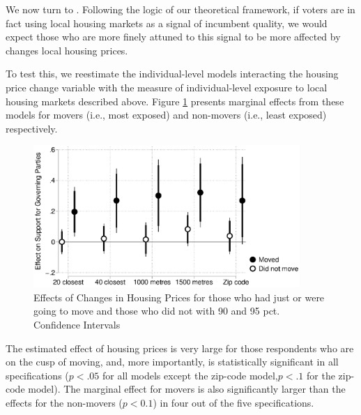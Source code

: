 \documentclass[12pt,a4paper]{article}
\begin{document}
	We now turn to \htwo. Following the logic of our theoretical framework, 	if voters are in fact using local housing markets as a signal of incumbent quality, we would expect those who are more finely attuned to this signal to be more affected by changes local housing prices.
	
	To test this, we reestimate the individual-level models interacting the housing price change variable with the measure of individual-level exposure to local housing markets described above. Figure \ref{move} presents marginal effects from these models for movers (i.e., most exposed) and non-movers (i.e., least exposed) respectively.
	
		\begin{figure}[htbp!]
		\includegraphics[width=0.9\textwidth]{../figures/moving.eps}
		\centering
		\caption{Effects of Changes in Housing Prices for those who had just or were going to move and those who did not with 90 and 95 pct. Confidence Intervals}\label{move}
	\end{figure}
	
	
The estimated effect of housing prices is very large for those respondents who are on the cusp of moving, and, more importantly, is statistically significant in all specifications ($p<.05$ for all models except the zip-code model,$p<.1$ for the zip-code model). The marginal effect for movers is also significantly larger than the effects for the non-movers ($p<0.1$) in four out of the five specifications.
	
\end{document}
